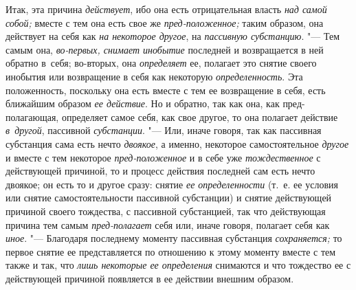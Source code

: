 Итак, эта причина {\em действует}, ибо она есть отрицательная власть
{\em над самой собой;} вместе с тем она есть свое же {\em пред-положенное;}
таким образом, она действует на себя как {\em на некоторое другое}, на
{\em пассивную субстанцию}. "--- Тем самым она,
{\em во-первых, снимает инобытие} последней и возвращается в ней обратно
в~себя; во-вторых, она {\em определяет} ее, полагает это снятие своего инобытия
или возвращение в себя как некоторую {\em определенность}. Эта положенность,
поскольку она есть вместе с тем ее возвращение в себя, есть ближайшим образом
{\em ее действие}. Но и обратно, так как она, как пред-полагающая, определяет
самое себя, как свое другое, то она полагает действие {\em в~другой}, пассивной
{\em субстанции}. "--- Или, иначе говоря, так как пассивная субстанция сама
есть нечто {\em двоякое}, а именно, некоторое самостоятельное {\em другое} и
вместе с тем некоторое {\em пред-положенное} и в себе уже {\em тождественное}
с действующей причиной, то и процесс действия последней сам есть нечто двоякое;
он есть то и другое сразу: снятие {\em ее определенности} (т.~е. ее условия или
снятие самостоятельности пассивной субстанции) и снятие действующей причиной
своего тождества, с пассивной субстанцией, так что действующая причина тем
самым {\em пред-полагает} себя или, иначе говоря, полагает себя как
{\em иное}. "--- Благодаря последнему моменту пассивная субстанция
{\em сохраняется;} то первое снятие ее представляется по отношению к этому
моменту вместе с тем также и так, что {\em лишь некоторые ее определения}
снимаются и что тождество ее с действующей причиной появляется
в ее действии внешним образом.

